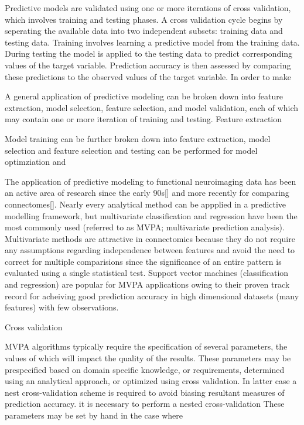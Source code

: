 \documentclass[5p]{elsarticle}
\begin{document}
Predictive models are validated using one or more iterations of cross
validation, which involves training and testing phases.  A cross validation
cycle begins by seperating the available data into two independent subsets:
training data and testing data.  Training involves learning a predictive model
from the training data. During testing the model is applied to the testing data
to predict corresponding values of the target variable.  Prediction accuracy is
then assessed by comparing these predictions to the observed values of the
target variable. In order to make 

A general application of predictive modeling can be broken down into feature
extraction, model selection, feature selection, and model validation, each of
which may contain one or more iteration of training and testing. Feature
extraction 


Model training can be further broken down into feature extraction, model
selection and feature selection and testing can be performed for model
optimziation and 


The application of predictive modeling to functional neuroimaging data has been
an active area of research since the early 90s[] and more recently for comparing
connectomes[]. Nearly every analytical method can be appplied in a predictive
modelling framework, but multivariate classification and regression have been
the most commonly used (referred to as MVPA; multivariate prediction analysis).
Multivariate methods are attractive in connectomics because they do not require
any assumptions regarding independence between features and avoid the need to
correct for multiple comparisions since the significance of an entire pattern is
evaluated using a single statistical test. Support vector machines
(classification and regression) are popular for MVPA applications owing to their
proven track record for acheiving good prediction accuracy in high dimensional
datasets (many features) with few observations.

Cross validation

MVPA algorithms typically require the specification of several parameters, the
values of which will impact the quality of the results. These parameters may be
prespecified based on domain specific knowledge, or requirements, determined
using an analytical approach, or optimized using cross validation. In latter
case a nest cross-validation scheme is required to avoid biasing resultant
measures of prediction accuracy. it is necessary to perform a nested
cross-validation These parameters may be set by hand in the case where 
\end{document}
